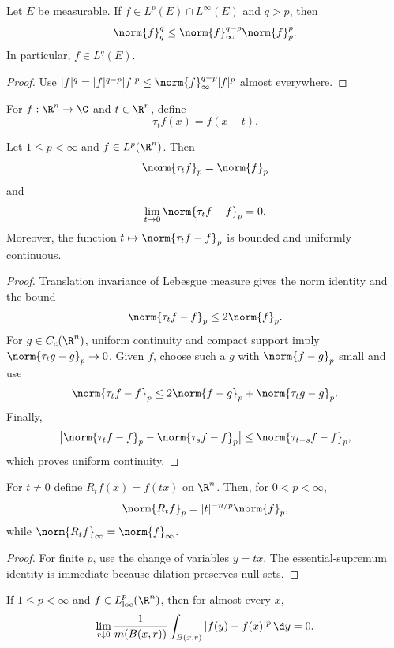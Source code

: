 \begin{prop}
Let $E$ be measurable. If $f\in L^p(E)\cap L^\infty(E)$ and $q>p$, then
\[
\norm{f}_q^q\leq\norm{f}_\infty^{q-p}\norm{f}_p^p.
\]
In particular, $f\in L^q(E)$.
\end{prop}

\begin{proof}
Use $|f|^q=|f|^{q-p}|f|^p\leq\norm{f}_\infty^{q-p}|f|^p$ almost everywhere.
\end{proof}

\begin{de}[Translations]
For $f:\R^n\to\C$ and $t\in\R^n$, define
\[
\tau_tf(x)=f(x-t).
\]
\end{de}

\begin{thm}
Let $1\leq p<\infty$ and $f\in L^p(\R^n)$. Then
\[
\norm{\tau_tf}_p=\norm{f}_p
\]
and
\[
\lim_{t\to0}\norm{\tau_tf-f}_p=0.
\]
Moreover, the function $t\mapsto\norm{\tau_tf-f}_p$ is bounded and uniformly continuous.
\end{thm}

\begin{proof}
Translation invariance of Lebesgue measure gives the norm identity and the bound
\[
\norm{\tau_tf-f}_p\leq2\norm{f}_p.
\]
For $g\in C_c(\R^n)$, uniform continuity and compact support imply $\norm{\tau_tg-g}_p\to0$. Given $f$, choose such a $g$ with $\norm{f-g}_p$ small and use
\[
\norm{\tau_tf-f}_p
\leq2\norm{f-g}_p+\norm{\tau_tg-g}_p.
\]
Finally,
\[
\bigl|\norm{\tau_tf-f}_p-\norm{\tau_sf-f}_p\bigr|
\leq\norm{\tau_{t-s}f-f}_p,
\]
which proves uniform continuity.
\end{proof}

\begin{prop}[Dilations]
For $t\neq0$ define $R_tf(x)=f(tx)$ on $\R^n$. Then, for $0<p<\infty$,
\[
\norm{R_tf}_p=|t|^{-n/p}\norm{f}_p,
\]
while $\norm{R_tf}_\infty=\norm{f}_\infty$.
\end{prop}

\begin{proof}
For finite $p$, use the change of variables $y=tx$. The essential-supremum identity is immediate because dilation preserves null sets.
\end{proof}

\begin{cor}
If $1\leq p<\infty$ and $f\in L^p_{\loc}(\R^n)$, then for almost every $x$,
\[
\lim_{r\downarrow0}\frac1{m(B(x,r))}
\int_{B(x,r)}|f(y)-f(x)|^p\,\d y=0.
\]
\end{cor}

